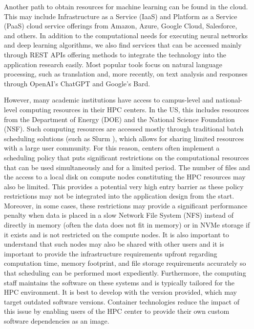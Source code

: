Another path to obtain resources for machine learning can be found in the cloud. This may include Infrastructure as a Service (IaaS) and Platform as a Service (PaaS) cloud service offerings from Amazon, Azure, Google Cloud, Salesforce, and others. In addition to the computational needs for executing neural networks and deep learning algorithms, we also find services that can be accessed mainly through REST APIs offering methods to integrate the technology into the application research easily. Most popular tools focus on natural language processing, such as translation and, more recently, on text analysis and responses through OpenAI's ChatGPT and Google's Bard.

However, many academic institutions have access to campus-level and national-level computing resources in their HPC centers. In the US, this includes resources from the Department of Energy (DOE) and the National Science Foundation (NSF). Such computing resources are accessed mostly through traditional batch scheduling solutions (such as Slurm \citep{www-slurm}), which allows for sharing limited resources with a large user community. For this reason, centers often implement a scheduling policy that puts significant restrictions on the computational resources that can be used simultaneously and for a limited period. The number of files and the access to a local disk on compute nodes constituting the HPC resources may also be limited. This provides a potential very high entry barrier as these policy restrictions may not be integrated into the application design from the start. Moreover, in some cases, these restrictions may provide a significant performance penalty when data is placed in a slow Network File System (NFS) instead of directly in memory (often the data does not fit in memory) or in NVMe storage if it exists and is not restricted on the compute nodes.  It is also important to understand that such nodes may also be shared with other users and it is important to provide the infrastructure requirements upfront regarding computation time, memory footprint, and file storage requirements accurately so that scheduling can be performed most expediently.  Furthermore, the computing staff maintains the software on these systems and is typically tailored for the HPC environment.  It is best to develop with the version provided, which may target outdated software versions.  Container technologies reduce the impact of this issue by enabling users of the HPC center to provide their own custom software dependencies as an image.

